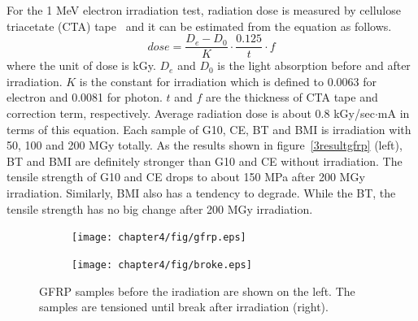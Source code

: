 For the 1 MeV electron irradiation test, radiation dose is measured by cellulose triacetate (CTA) tape~\cite{cta} and it can be estimated from the equation as follows.
\begin{equation}
 dose = \frac{D_e - D_0}{K} \cdot \frac{0.125}{t} \cdot f
\end{equation}
where the unit of dose is kGy.
$D_e$ and $D_0$ is the light absorption before and after irradiation.
$K$ is the constant for irradiation which is defined to 0.0063 for electron and 0.0081 for photon.
$t$ and $f$ are the thickness of CTA tape and correction term, respectively.
Average radiation dose is about 0.8 kGy/sec$\cdot$mA in terms of this equation.
Each sample of G10, CE, BT and BMI is irradiation with 50, 100 and 200 MGy totally.
As the results shown in figure~\ref{3resultgfrp} (left), BT and BMI are definitely stronger than G10 and CE without irradiation.
The tensile strength of G10 and CE drops to about 150 MPa after 200 MGy irradiation.
Similarly, BMI also has a tendency to degrade.
While the BT, the tensile strength has no big change after 200 MGy irradiation.
 \begin{figure}[H]
  \begin{subfigure}{0.22\textwidth}
   \centering
   \texttt{[image: chapter4/fig/gfrp.eps]}
  \end{subfigure}
  \hspace{0.2\textwidth}
  \begin{subfigure}{0.22\textwidth}
   \centering
   \texttt{[image: chapter4/fig/broke.eps]}
  \end{subfigure}
  \caption{GFRP samples before the iradiation are shown on the left. The samples are tensioned until break after irradiation (right).}
  \label{3samplegfrp}
 \end{figure}
